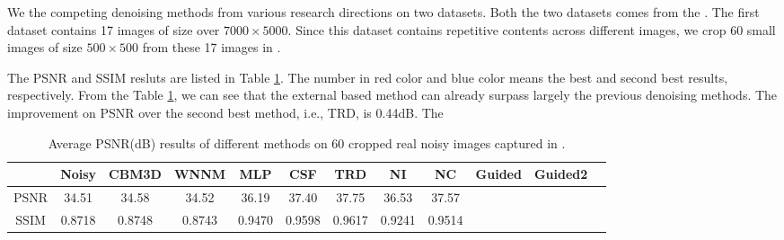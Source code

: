 \documentclass[10pt,twocolumn,letterpaper]{article}
\begin{document}
We the competing denoising methods from various research directions on two datasets. Both the two datasets comes from the \cite{crosschannel2016}. The first dataset contains 17 images of size over $7000\times5000$. Since this dataset contains repetitive contents across different images, we crop 60 small images of size $500\times500$ from these 17 images in \cite{crosschannel2016}.

The PSNR and SSIM resluts are listed in Table \ref{tab1}. The number in red color and blue color means the best and second best results, respectively. From the Table \ref{tab1}, we can see that the external based method can already surpass largely the previous denoising methods. The improvement on PSNR over the second best method, i.e., TRD, is 0.44dB. The 
\begin{table}\label{tab1}
\caption{Average PSNR(dB) results of different methods on 60 cropped real noisy images captured in \cite{crosschannel2016}.}
\label{tab1}
\begin{center}
\renewcommand\arraystretch{1}
\begin{tabular}{|c||c|c|c|c|c|c|c|c|c|c|c|}
\hline
 & \textbf{Noisy} &\textbf{CBM3D}&\textbf{WNNM}&\textbf{MLP}&\textbf{CSF}&\textbf{TRD}& \textbf{NI}& \textbf{NC} &\textbf{Guided}  &\textbf{Guided2} 
\\
\hline
PSNR & 34.51 & 34.58 & 34.52 & 36.19 & 37.40 & 37.75 & 36.53 & 37.57 &  \color{blue}{38.72} & \color{red}{ 38.90}
\\
\hline
SSIM & 0.8718  & 0.8748  & 0.8743   & 0.9470 & 0.9598 &  0.9617 & 0.9241  &  0.9514  & \color{blue}{0.9694} & \color{red}{0.9702}
\\
\hline
\end{tabular}
\end{center}
\end{table}
\end{document}
